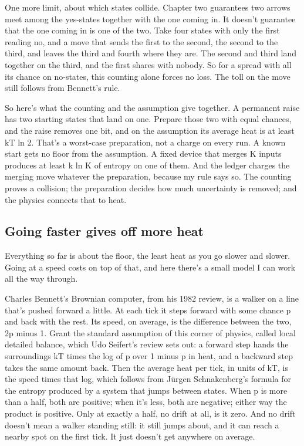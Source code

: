\documentclass[11pt,twoside]{article}
\theoremstyle{thielethm}
\theoremstyle{thieledef}
\theoremstyle{thieledef}
\theoremstyle{thieledef}
\theoremstyle{thielethm}
\theoremstyle{thieleobs}
\theoremstyle{thielethm}
\begin{document}
One more limit, about which states collide. Chapter two guarantees two arrows meet among the yes-states together with the one coming in. It doesn't guarantee that the one coming in is one of the two. Take four states with only the first reading no, and a move that sends the first to the second, the second to the third, and leaves the third and fourth where they are. The second and third land together on the third, and the first shares with nobody. So for a spread with all its chance on no-states, this counting alone forces no loss. The toll on the move still follows from Bennett's rule.

So here's what the counting and the assumption give together. A permanent raise has two starting states that land on one. Prepare those two with equal chances, and the raise removes one bit, and on the assumption its average heat is at least kT ln 2. That's a worst-case preparation, not a charge on every run. A known start gets no floor from the assumption. A fixed device that merges K inputs produces at least k ln K of entropy on one of them. And the ledger charges the merging move whatever the preparation, because my rule says so. The counting proves a collision; the preparation decides how much uncertainty is removed; and the physics connects that to heat.

\subsection{Going faster gives off more heat}

Everything so far is about the floor, the least heat as you go slower and slower. Going at a speed costs on top of that, and here there's a small model I can work all the way through.

Charles Bennett's Brownian computer, from his 1982 review, is a walker on a line that's pushed forward a little. At each tick it steps forward with some chance p and back with the rest. Its speed, on average, is the difference between the two, 2p minus 1. Grant the standard assumption of this corner of physics, called local detailed balance, which Udo Seifert's review sets out: a forward step hands the surroundings kT times the log of p over 1 minus p in heat, and a backward step takes the same amount back. Then the average heat per tick, in units of kT, is the speed times that log, which follows from Jürgen Schnakenberg's formula for the entropy produced by a system that jumps between states. When p is more than a half, both are positive; when it's less, both are negative; either way the product is positive. Only at exactly a half, no drift at all, is it zero. And no drift doesn't mean a walker standing still: it still jumps about, and it can reach a nearby spot on the first tick. It just doesn't get anywhere on average.
\end{document}
